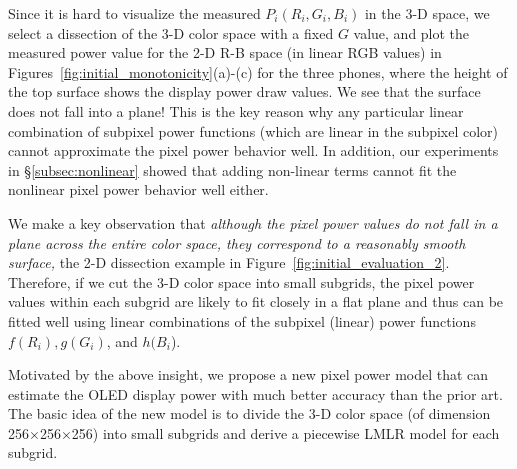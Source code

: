 Since it is hard to visualize the measured $P_i(R_i, G_i,B_i)$ in the
3-D space, we select a dissection of the 3-D color space with a fixed
$G$ value, and plot the measured power value for the 2-D R-B space (in
linear RGB values) in Figures~\ref{fig:initial_monotonicity}(a)-(c) for
the three phones, where the height of the top surface shows the display power
draw values.  We see that the surface does not fall into a plane! This is
the key reason why any particular linear combination of subpixel power functions
(which are linear in the subpixel color) cannot approximate
the pixel power behavior well. In addition,
our experiments in \S\ref{subsec:nonlinear} showed
that adding non-linear terms cannot fit the nonlinear pixel power behavior well either.

We make a key observation that {\em although the pixel power values do not
fall in a plane across the entire color space, they correspond to a reasonably smooth surface,}
\eg the 2-D dissection example in Figure~\ref{fig:initial_evaluation_2}. 
Therefore, if we cut the 3-D color space into small subgrids, the
pixel power values within each subgrid are likely to fit closely in
a flat plane and thus can be fitted well using linear combinations
of the subpixel (linear) power functions $f(R_{i}), g(G_i)$, and $h(B_i$).

Motivated by the above insight, we propose a new pixel power model
that can estimate the OLED display power with much better accuracy
than the prior art.  The basic idea of the new model is to divide the 3-D
color space (of dimension 256$\times$256$\times$256) into small subgrids
and derive a piecewise LMLR model for each subgrid.



